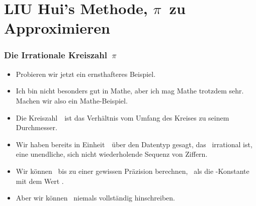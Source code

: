 \documentclass[aspectratio=169,mathserif,notheorems]{beamer}%
\begin{document}
\section{LIU Hui's Methode, $\pi$~zu Approximieren}%
%
\begin{frame}%
\frametitle{Die Irrationale Kreiszahl~$\pi$}%
\begin{itemize}%
\item Probieren wir jetzt ein ernsthafteres Beispiel.%
\item<2-> Ich bin nicht besonders gut in Mathe, aber ich mag Mathe trotzdem sehr. Machen wir also ein Mathe-Beispiel.%
\item<3-> Die Kreiszahl~\numberPi\ ist das Verhältnis vom Umfang des Kreises zu seinem Durchmesser.%
\item<4-> Wir haben bereits in Einheit~\unitFloat\ über den Datentyp  gesagt, das \numberPi\ \gls{irrational} ist, eine unendliche, sich nicht wiederholende Sequenz von Ziffern.%
\item<5-> Wir können \numberPi\ bis zu einer gewissen Präzision berechnen, \DEzB~als die -Konstante  mit dem Wert .%
\item<6-> Aber wir können \numberPi\ niemals vollständig hinschreiben.%
\end{itemize}%
\end{frame}%
%
\end{document}

